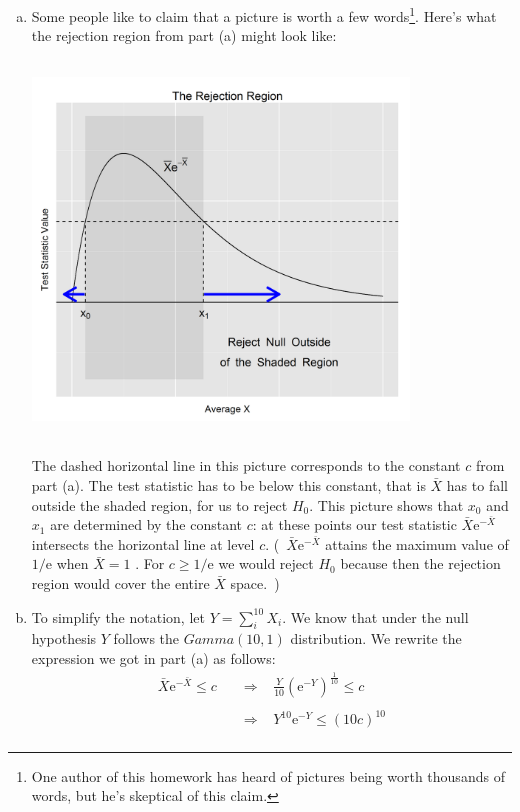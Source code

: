 \documentclass[12pt]{article}
\begin{document}
\begin{enumerate}[(a)]
\item
Some people like to claim that a picture is worth a few words\footnote{One author of this homework has heard of pictures being worth thousands of words, but he's skeptical of this claim.}. Here's what the rejection region from part (a) might look like:

\begin{center}
\includegraphics[width=10cm, height=10cm]{rejection_region_plot}
\end{center} 

The dashed horizontal line in this picture corresponds to the constant $c$ from part (a). The test statistic has to be below this constant, that is $\bar X$ has to fall outside the shaded region, for us to reject $H_0$. This picture shows that $x_0$ and $x_1$ are determined by the constant $c$: at these points our test statistic $\bar X \mathrm{e}^{-\bar X}$ intersects the horizontal line at level $c$. (\ $\bar X \mathrm{e}^{-\bar X}$ attains the maximum value of $1/\mathrm{e}$ when $\bar X = 1$ . For $c \geq 1/\mathrm{e}$ we would reject $H_0$ because then the rejection region would cover the entire $\bar X$ space.\ ) 
\bigskip
\item
To simplify the notation, let $Y = \sum_i^{10} X_i$. We know that under the null hypothesis $Y$ follows the $Gamma(10, 1)$ distribution. We rewrite the expression we got in part (a) as follows:
\begin{align*}
\bar X \mathrm{e}^{-\bar X} \leq c \; \; \; &\Rightarrow \; \; \; \frac{Y}{10} (\mathrm{e}^{-Y})^{\frac{1}{10}} \leq c\\
\\
&\Rightarrow \; \; \; Y^{10} \mathrm{e}^{-Y} \leq (10 c)^{10} \\
\end{align*}


\end{enumerate}
\end{document}
